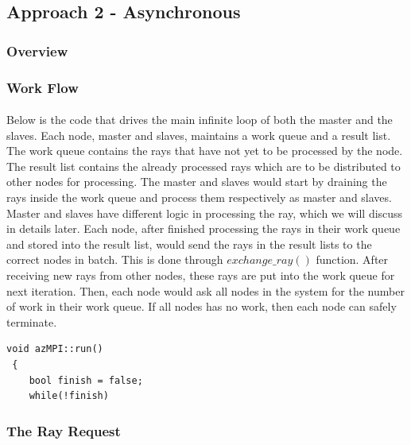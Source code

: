 \documentclass[a4paper, oneside, 10pt]{article}
\begin{document}
\subsection{Approach 2 - Asynchronous}
\subsubsection{Overview}
\subsubsection{Work Flow}
\paragraph{} Below is the code that drives the main infinite loop of both the master and the slaves. Each node, master and slaves, maintains a work queue and a result list. The work queue contains the rays that have not yet to be processed by the node. The result list contains the already processed rays which are to be distributed to other nodes for processing. The master and slaves would start by draining the rays inside the work queue and process them respectively as master and slaves. Master and slaves have different logic in processing the ray, which we will discuss in details later.  Each node, after finished processing the rays in their work queue and stored into the result list, would send the rays in the result lists to the correct nodes in batch. This is done through $exchange\_ray()$ function. After receiving new rays from other nodes, these rays are put into the work queue for next iteration. Then, each node would ask all nodes in the system for the number of work in their work queue. If all nodes has no work, then each node can safely terminate.
 \lstset{language=C++} 
 \begin{lstlisting}[frame=single] 
void azMPI::run()
 {
    bool finish = false;
    while(!finish)
\end{lstlisting}

\subsubsection{The Ray Request}
\end{document}
